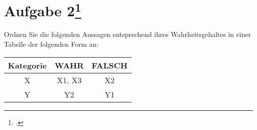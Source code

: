 \documentclass{lehramt-informatik-aufgabe}
\begin{document}
\section{Aufgabe 2\footcite{sosy:ab:9}}

Ordnen Sie die folgenden Aussagen entsprechend ihres Wahrheitsgehaltes
in einer Tabelle der folgenden Form an:

\begin{center}
\begin{tabular}{|c|c|c|}
\hline
Kategorie & WAHR & FALSCH \\\hline\hline
X & X1, X3 & X2 \\\hline
Y & Y2 & Y1 \\\hline
\end{tabular}
\end{center}
\end{document}
